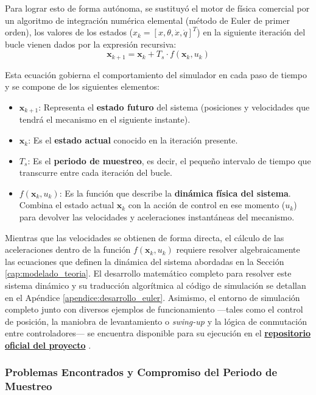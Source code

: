 \documentclass[11pt,fleqn]{book} %
\begin{document}
Para lograr esto de forma autónoma, se sustituyó el motor de física comercial por un algoritmo de integración numérica elemental (método de Euler de primer orden), los valores de los estados ($x_k = [x, \theta, \dot{x}, \dot{q}]^T$) en la siguiente iteración del bucle vienen dados por la expresión recursiva:
\begin{equation}
	\mathbf{x}_{k+1} = \mathbf{x}_k + T_s \cdot f(\mathbf{x}_k, u_k)
\end{equation}

Esta ecuación gobierna el comportamiento del simulador en cada paso de tiempo y se compone de los siguientes elementos:
\begin{itemize}[leftmargin=1cm, topsep=1mm, itemsep=0.5mm]
	\item $\mathbf{x}_{k+1}$: Representa el \textbf{estado futuro} del sistema (posiciones y velocidades que tendrá el mecanismo en el siguiente instante).
	\item $\mathbf{x}_k$: Es el \textbf{estado actual} conocido en la iteración presente.
	\item $T_s$: Es el \textbf{periodo de muestreo}, es decir, el pequeño intervalo de tiempo que transcurre entre cada iteración del bucle.
	\item $f(\mathbf{x}_k, u_k)$: Es la función que describe la \textbf{dinámica física del sistema}. Combina el estado actual $\mathbf{x}_k$ con la acción de control en ese momento ($u_k$) para devolver las velocidades y aceleraciones instantáneas del mecanismo.
\end{itemize}

Mientras que las velocidades se obtienen de forma directa, el cálculo de las aceleraciones dentro de la función $f(\mathbf{x}_k, u_k)$ requiere resolver algebraicamente las ecuaciones que definen la dinámica del sistema abordadas en la Sección \ref{cap:modelado_teoria}. El desarrollo matemático completo para resolver este sistema dinámico y su traducción algorítmica al código de simulación se detallan en el Apéndice \ref{apendice:desarrollo_euler}. Asimismo, el entorno de simulación completo junto con diversos ejemplos de funcionamiento —tales como el control de posición, la maniobra de levantamiento o \textit{swing-up} y la lógica de conmutación entre controladores— se encuentra disponible para su ejecución en el \href{https://github.com/MPV247/TFG_Control_MiguelPorcar}{\textbf{repositorio oficial del proyecto}} \cite{Porcar2026TFG}.
\newpage
\subsubsection{Problemas Encontrados y Compromiso del Periodo de Muestreo}
\end{document}
